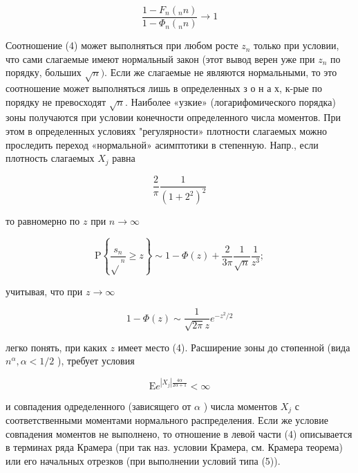 \documentclass[10pt]{article}
\begin{document}
\[

\frac{1-F_{n}\left({ }_{n} n\right)}{1-\Phi_{n}\left({ }_{n} n\right)} \rightarrow 1

\]



Соотношение (4) может выполняться при любом росте $z_{n}$ только при условии, что сами слагаемые имеют нормальный закон (этот вывод верен уже при $z_{n}$ по порядку, больших $\sqrt{n})$. Если же слагаемые не являются нормальными, то это соотношение может выполняться лишь в определенных з о н а х, к-рые по порядку не превосходят $\sqrt{n}$. Наиболее «узкие» (логарифомического порядка) зоны получаются при условии конечности определенного числа моментов. При этом в определенных условиях "регулярности» плотности слагаемых можно проследить переход «нормальной» асимптотики в степенную. Напр., если плотность слагаемых $X_{j}$ равна



\[

\frac{2}{\pi} \frac{1}{\left(1+2^{2}\right)^{2}}

\]



то равномерно по $z$ при $n \rightarrow \infty$



\[

\mathrm{P}\left\{\frac{s_{n}}{\sqrt{ }{ }^{n}} \geqslant z\right\} \sim 1-\Phi(z)+\frac{2}{3 \pi} \frac{1}{\sqrt{n}} \frac{1}{z^{3}} ;

\]



учитывая, что при $z \rightarrow \infty$



\[

1-\Phi(z) \sim \frac{1}{\sqrt{2 \pi} z} e^{-z^{2} / 2}

\]



легко понять, при каких $z$ имеет место (4). Расширение зоны до стөпенной (вида $n^{\alpha}, \alpha<1 / 2$ ), требует условия



\[

\mathrm{E} e^{\left|X_{j}\right| \frac{4 \alpha}{2 \alpha+1}}<\infty

\]



и совпадения одределенного (зависящего от $\alpha$ ) числа моментов $X_{j}$ с соответственными моментами нормального распределения. Если же условие совпадения моментов не выполнено, то отношение в левой части (4) описывается в терминах ряда Крамера (при так наз. условии Крамера, см. Крамера теорема) или его начальных отрезков (при выполнении условий типа (5)).
\end{document}
